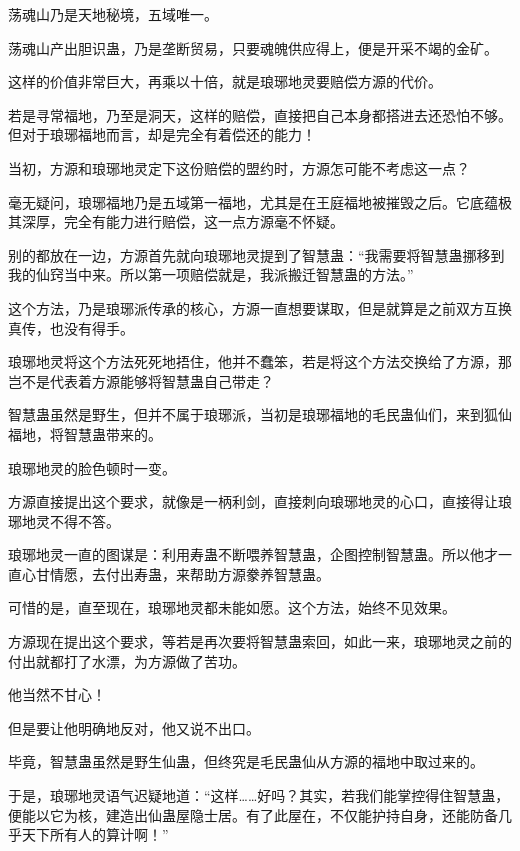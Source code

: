 
\begin{this_body}



荡魂山乃是天地秘境，五域唯一。

荡魂山产出胆识蛊，乃是垄断贸易，只要魂魄供应得上，便是开采不竭的金矿。

这样的价值非常巨大，再乘以十倍，就是琅琊地灵要赔偿方源的代价。

若是寻常福地，乃至是洞天，这样的赔偿，直接把自己本身都搭进去还恐怕不够。但对于琅琊福地而言，却是完全有着偿还的能力！

当初，方源和琅琊地灵定下这份赔偿的盟约时，方源怎可能不考虑这一点？

毫无疑问，琅琊福地乃是五域第一福地，尤其是在王庭福地被摧毁之后。它底蕴极其深厚，完全有能力进行赔偿，这一点方源毫不怀疑。

别的都放在一边，方源首先就向琅琊地灵提到了智慧蛊：“我需要将智慧蛊挪移到我的仙窍当中来。所以第一项赔偿就是，我派搬迁智慧蛊的方法。”

这个方法，乃是琅琊派传承的核心，方源一直想要谋取，但是就算是之前双方互换真传，也没有得手。

琅琊地灵将这个方法死死地捂住，他并不蠢笨，若是将这个方法交换给了方源，那岂不是代表着方源能够将智慧蛊自己带走？

智慧蛊虽然是野生，但并不属于琅琊派，当初是琅琊福地的毛民蛊仙们，来到狐仙福地，将智慧蛊带来的。

琅琊地灵的脸色顿时一变。

方源直接提出这个要求，就像是一柄利剑，直接刺向琅琊地灵的心口，直接得让琅琊地灵不得不答。

琅琊地灵一直的图谋是：利用寿蛊不断喂养智慧蛊，企图控制智慧蛊。所以他才一直心甘情愿，去付出寿蛊，来帮助方源豢养智慧蛊。

可惜的是，直至现在，琅琊地灵都未能如愿。这个方法，始终不见效果。

方源现在提出这个要求，等若是再次要将智慧蛊索回，如此一来，琅琊地灵之前的付出就都打了水漂，为方源做了苦功。

他当然不甘心！

但是要让他明确地反对，他又说不出口。

毕竟，智慧蛊虽然是野生仙蛊，但终究是毛民蛊仙从方源的福地中取过来的。

于是，琅琊地灵语气迟疑地道：“这样……好吗？其实，若我们能掌控得住智慧蛊，便能以它为核，建造出仙蛊屋隐士居。有了此屋在，不仅能护持自身，还能防备几乎天下所有人的算计啊！”


\end{this_body}
